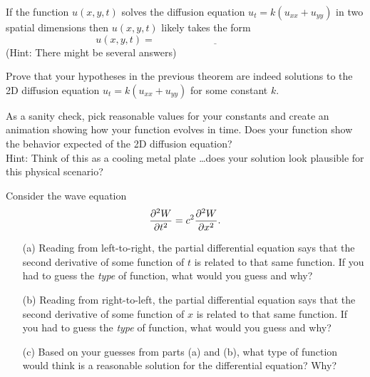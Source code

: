 \begin{thm}
    If the function $u(x,y,t)$ solves the diffusion equation $u_t = k(u_{xx} + u_{yy})$ in
    two spatial dimensions then $u(x,y,t)$ likely takes the form
    \[ u(x,y,t) = \underline{\hspace{2in}} \]
    (Hint: There might be several answers)
\end{thm}

\begin{problem}
    Prove that your hypotheses in the previous theorem are indeed solutions to the 2D
    diffusion equation $u_t = k (u_{xx} + u_{yy})$ for some constant $k$.
\end{problem}

\begin{problem}
    As a sanity check, pick reasonable values for your constants and create an animation
    showing how your function evolves in time.  Does your function show the behavior
    expected of the 2D diffusion equation?  \\
    Hint: Think of this as a cooling metal plate \ldots does your solution look
    plausible for this physical scenario?
\end{problem}



\begin{problem}
    Consider the wave equation 
    \[ \frac{\partial^2{W}}{\partial{t}^2} = c^2 \frac{\partial^2{W}}{\partial{x}^2}. \]
    \begin{enumerate}
        \item[(a)] Reading from left-to-right, the partial differential equation says that
            the second derivative of some function of $t$ is related to that same function.  If
            you had to guess the {\it type} of function, what would you guess and why?
        \item[(b)] Reading from right-to-left, the partial differential equation says that
            the second derivative of some function of $x$ is related to that same
            function.  If you had to guess the {\it type} of function, what would you
            guess and why?
        \item[(c)] Based on your guesses from parts (a) and (b), what type of function
            would think is a reasonable solution for the differential equation?  Why?
    \end{enumerate}
\end{problem}




